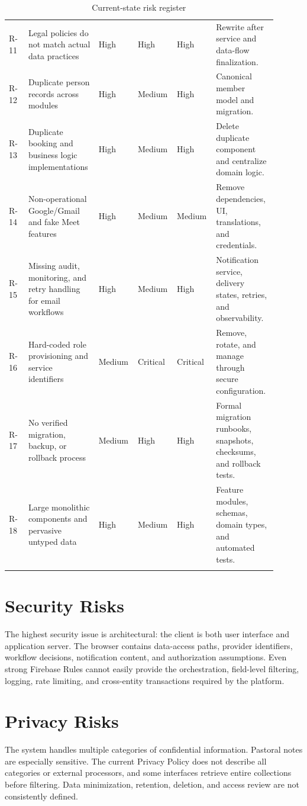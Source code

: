 \documentclass[11pt,a4paper,oneside]{report}
\begin{document}
\begin{longtable}{@{}p{0.07\linewidth} p{0.25\linewidth} p{0.12\linewidth} p{0.12\linewidth} p{0.12\linewidth} p{0.22\linewidth}@{}}
R-11 & Legal policies do not match actual data practices & High & High & High & Rewrite after service and data-flow finalization. \\
R-12 & Duplicate person records across modules & High & Medium & High & Canonical member model and migration. \\
R-13 & Duplicate booking and business logic implementations & High & Medium & High & Delete duplicate component and centralize domain logic. \\
R-14 & Non-operational Google/Gmail and fake Meet features & High & Medium & Medium & Remove dependencies, UI, translations, and credentials. \\
R-15 & Missing audit, monitoring, and retry handling for email workflows & High & Medium & High & Notification service, delivery states, retries, and observability. \\
R-16 & Hard-coded role provisioning and service identifiers & Medium & Critical & Critical & Remove, rotate, and manage through secure configuration. \\
R-17 & No verified migration, backup, or rollback process & Medium & High & High & Formal migration runbooks, snapshots, checksums, and rollback tests. \\
R-18 & Large monolithic components and pervasive untyped data & High & Medium & High & Feature modules, schemas, domain types, and automated tests. \\
\bottomrule
\caption{Current-state risk register}
\end{longtable}

\section{Security Risks}

The highest security issue is architectural: the client is both user interface and application server. The browser contains data-access paths, provider identifiers, workflow decisions, notification content, and authorization assumptions. Even strong Firebase Rules cannot easily provide the orchestration, field-level filtering, logging, rate limiting, and cross-entity transactions required by the platform.

\section{Privacy Risks}

The system handles multiple categories of confidential information. Pastoral notes are especially sensitive. The current Privacy Policy does not describe all categories or external processors, and some interfaces retrieve entire collections before filtering. Data minimization, retention, deletion, and access review are not consistently defined.
\end{document}
